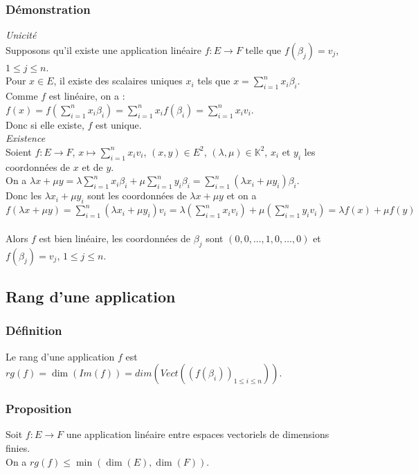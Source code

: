 \documentclass[a4paper,10pt]{book} %
\newcommand{\K}{\mathbb{K}}
\begin{document}
\subsubsection{Démonstration}
\textit{Unicité}\\
Supposons qu'il existe une application linéaire $f:E\rightarrow F$ telle que $f(\beta_j)=v_j$, $1\leq j\leq n$.\\
Pour $x\in E$, il existe des scalaires uniques $x_i$ tels que $\displaystyle x=\sum\limits_{i=1}^nx_i\beta_i$.\\
Comme $f$ est linéaire, on a : $\displaystyle f(x)=f(\sum\limits_{i=1}^nx_i\beta_i)=\sum\limits_{i=1}^nx_if(\beta_i)=\sum\limits_{i=1}^nx_iv_i$.\\

Donc si elle existe, $f$ est unique.\\

\textit{Existence}\\
Soient $f:E\rightarrow F$, $x\mapsto\sum\limits_{i=1}^nx_iv_i$, $(x,y) \in E^2$, $(\lambda,\mu) \in \K^2$, $x_i$ et $y_i$ les coordonnées de $x$ et de $y$.\\
On a $\displaystyle \lambda x+\mu y=\lambda\sum\limits_{i=1}^nx_i\beta_i+\mu \sum\limits_{i=1}^ny_i\beta_i=\sum\limits_{i=1}^n(\lambda x_i+\mu y_i)\beta_i$.\\

Donc les $\lambda x_i+\mu y_i$ sont les coordonnées de $\lambda x+\mu y$ et on a\\
$\displaystyle f(\lambda x+\mu y)=\sum\limits_{i=1}^n(\lambda x_i+\mu y_i)v_i=\lambda(\sum\limits_{i=1}^nx_iv_i)+\mu(\sum\limits_{i=1}^ny_iv_i)=\lambda f(x)+\mu f(y)$\\\\
Alors $f$ est bien linéaire, les coordonnées de $\beta_j$ sont $(0,0,...,1,0,...,0)$ et $f(\beta_j)=v_j$, $1\leq j\leq n$.

\subsection{Rang d'une application}
\subsubsection{Définition}
Le rang d'une application $f$ est $rg(f)=\dim(Im(f))=dim(Vect((f(\beta_i))_{1\leq i\leq n}))$.

\subsubsection{Proposition}
Soit $f :E\rightarrow F$ une application linéaire entre espaces vectoriels de dimensions finies.\\
On a $rg(f)\leq \min(\dim(E),\dim(F))$.
\end{document}
